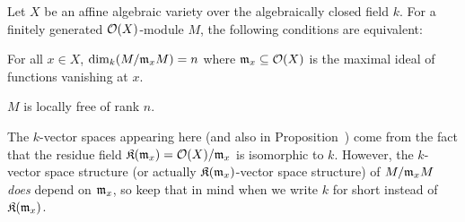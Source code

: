 \documentclass[a4paper,parskip=half,numbers=enddot, DIV=12]{scrreprt}
\begin{document}
\begin{prop}
    Let $X$ be an affine algebraic variety over the algebraically closed field $k$. For a finitely generated $\mathcal{O}(X)$-module $M$, the following conditions are equivalent:
    \begin{alphanumerate}
        \item 
            For all $x\in X$, $\dim_k(M/\mathfrak{m}_x M)=n$ where $\mathfrak{m}_x\subseteq\mathcal{O}(X)$ is the maximal ideal of functions vanishing at $x$.
        \item 
            $M$ is locally free of rank $n$.
    \end{alphanumerate}
\end{prop}
\begin{rem*}
	The $k$-vector spaces appearing here (and also in Proposition~) come from the fact that the residue field $\mathfrak{K}(\mathfrak{m}_x)=\mathcal{O}(X)/\mathfrak{m}_x$ is isomorphic to $k$. However, the $k$-vector space structure (or actually $\mathfrak{K}(\mathfrak{m}_x)$-vector space structure) of $M/\mathfrak{m}_xM$ \emph{does} depend on $\mathfrak{m}_x$, so keep that in mind when we write $k$ for short instead of $\mathfrak{K}(\mathfrak{m}_x)$.
\end{rem*}
\end{document}

